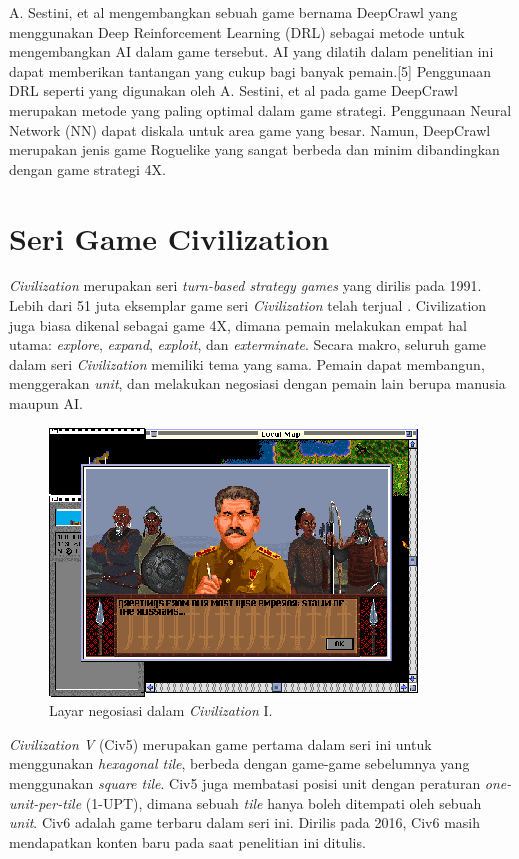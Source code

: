 A. Sestini, et al \citep{deepCrawl} mengembangkan sebuah game bernama DeepCrawl yang menggunakan Deep Reinforcement Learning (DRL) sebagai metode untuk mengembangkan AI dalam game tersebut. AI yang dilatih dalam penelitian ini dapat memberikan tantangan yang cukup bagi banyak pemain.[5] Penggunaan DRL seperti yang digunakan oleh A. Sestini, et al pada game DeepCrawl merupakan metode yang paling optimal dalam game strategi. Penggunaan Neural Network (NN) dapat diskala untuk area game yang besar. Namun, DeepCrawl merupakan jenis game Roguelike yang sangat berbeda dan minim dibandingkan dengan game strategi 4X.

\section{Seri Game Civilization}
\emph{Civilization} merupakan seri \emph{turn-based strategy games} yang dirilis pada 1991. 
Lebih dari 51 juta eksemplar game seri \emph{Civilization} telah terjual \citep{civ6CopiesSold}.
Civilization juga biasa dikenal sebagai game 4X,
dimana pemain melakukan empat hal utama: \emph{explore}, \emph{expand}, \emph{exploit}, dan \emph{exterminate}. Secara makro, seluruh game
dalam seri \emph{Civilization} memiliki tema yang sama. Pemain dapat membangun, menggerakan \emph{unit}, dan melakukan negosiasi dengan pemain lain
berupa manusia maupun AI.

\begin{figure}[H]
  \centering
    \includegraphics[scale=1]{gambar/Civ_1_negotiation.png}
    \caption{Layar negosiasi dalam \emph{Civilization} I.}
    \label{fig:civ1Negotiation}
\end{figure}

\emph{Civilization V} (Civ5) merupakan game pertama dalam seri ini untuk menggunakan \emph{hexagonal tile},
berbeda dengan game-game sebelumnya yang menggunakan \emph{square tile}. Civ5 juga membatasi posisi unit dengan peraturan \emph{one-unit-per-tile}
(1-UPT), dimana sebuah \emph{tile} hanya boleh ditempati oleh sebuah \emph{unit}.
Civ6 adalah game terbaru dalam seri ini. Dirilis pada 2016, Civ6 masih mendapatkan konten baru pada saat penelitian ini ditulis.

